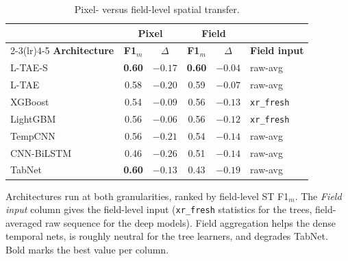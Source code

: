 \documentclass[journal]{IEEEtran}
\begin{document}
\begin{table}[!t]
\centering
\caption{Pixel- versus field-level spatial transfer.}
\label{tab:pixfield}
\renewcommand{\arraystretch}{1.1}
\setlength{\tabcolsep}{3.5pt}
\footnotesize
\begin{tabular}{lccccl}
\toprule
 & \multicolumn{2}{c}{\textbf{Pixel}} & \multicolumn{2}{c}{\textbf{Field}} & \\
\cmidrule(lr){2-3}\cmidrule(lr){4-5}
\textbf{Architecture} & \textbf{F1$_m$} & \textbf{$\Delta$} & \textbf{F1$_m$} & \textbf{$\Delta$} & \textbf{Field input} \\
\midrule
L-TAE-S    & \textbf{0.60} & $-0.17$         & \textbf{0.60} & $\mathbf{-0.04}$ & raw-avg \\
L-TAE      & 0.58          & $-0.20$         & 0.59          & $-0.07$         & raw-avg \\
XGBoost    & 0.54          & $-0.09$         & 0.56          & $-0.13$         & \texttt{xr\_fresh} \\
LightGBM   & 0.56          & $\mathbf{-0.06}$ & 0.56          & $-0.12$         & \texttt{xr\_fresh} \\
TempCNN    & 0.56          & $-0.21$         & 0.54          & $-0.14$         & raw-avg \\
CNN-BiLSTM & 0.46          & $-0.26$         & 0.51          & $-0.14$         & raw-avg \\
TabNet     & \textbf{0.60} & $-0.13$         & 0.43          & $-0.19$         & raw-avg \\
\bottomrule
\end{tabular}
\par\vspace{3pt}
\begin{minipage}{\columnwidth}
\footnotesize
Architectures run at both granularities, ranked by field-level ST F1$_m$. The \emph{Field input} column gives the field-level input (\texttt{xr\_fresh} statistics for the trees, field-averaged raw sequence for the deep models). Field aggregation helps the dense temporal nets, is roughly neutral for the tree learners, and degrades TabNet. Bold marks the best value per column.
\end{minipage}
\end{table}
\end{document}
